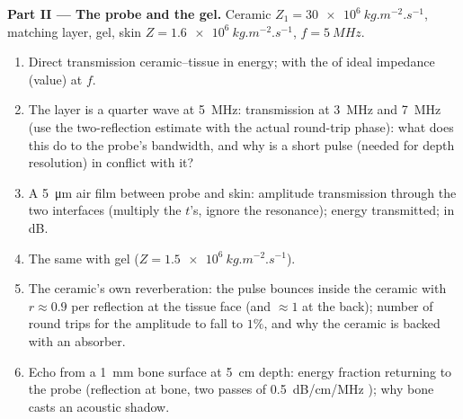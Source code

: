 \begin{problem}
\medskip
\noindent\textbf{Part II --- The probe and the gel.}
Ceramic $Z_1 = \qty{30e6}{kg.m^{-2}.s^{-1}}$, matching layer, gel, skin $Z =
\qty{1.6e6}{kg.m^{-2}.s^{-1}}$, $f = \qty{5}{MHz}$.
\begin{enumerate}[resume]
  \item Direct transmission ceramic--tissue in energy; with the
         of ideal impedance (value) at $f$.
  \item The layer is a quarter wave at \qty{5}{MHz}: transmission
        at \qty{3}{MHz} and \qty{7}{MHz} (use the two-reflection estimate
        with the actual round-trip phase): what does this do to the
        probe's bandwidth, and why is a short pulse (needed for depth
        resolution) in conflict with it?
  \item A \qty{5}{\micro m} air film between probe and skin: amplitude
        transmission through the two interfaces (multiply the $t$'s,
        ignore the resonance); energy transmitted; in dB.
  \item The same with gel ($Z = \qty{1.5e6}{kg.m^{-2}.s^{-1}}$).
  \item The ceramic's own reverberation: the pulse bounces inside
        the ceramic with $r \approx 0.9$ per reflection at the tissue face
        (and $\approx 1$ at the back); number of round trips for the
        amplitude to fall to $1\%$, and why the ceramic is backed with
        an absorber.
  \item Echo from a \qty{1}{mm} bone surface at \qty{5}{cm} depth: energy
        fraction returning to the probe (reflection at bone, two
        passes of \qty{0.5}{dB/cm/MHz} ); why bone casts an
        acoustic shadow.
\end{enumerate}


\end{problem}
